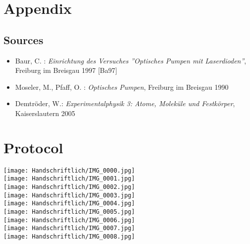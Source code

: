 \section{Appendix}

\begin{appendix}
\section{Sources}

\begin{itemize}
\item Baur, C. : \emph{Einrichtung des Versuches ''Optisches Pumpen mit Laserdioden''}, Freiburg im Breisgau 1997 [Ba97]
\item Moseler, M., Pfaff, O. : \emph{Optisches Pumpen}, Freiburg im Breisgau 1990
\item Demtröder, W.: \emph{Experimentalphysik 3: Atome, Moleküle und Festkörper}, Kaiserslautern 2005
\end{itemize}

\end{appendix}

\clearpage

\section{Protocol}
\centering \texttt{[image: Handschriftlich/IMG\_0000.jpg]}\\
\centering \texttt{[image: Handschriftlich/IMG\_0001.jpg]}\\
\centering \texttt{[image: Handschriftlich/IMG\_0002.jpg]}\\
\centering \texttt{[image: Handschriftlich/IMG\_0003.jpg]}\\
\centering \texttt{[image: Handschriftlich/IMG\_0004.jpg]}\\
\centering \texttt{[image: Handschriftlich/IMG\_0005.jpg]}\\
\centering \texttt{[image: Handschriftlich/IMG\_0006.jpg]}\\
\centering \texttt{[image: Handschriftlich/IMG\_0007.jpg]}\\
\centering \texttt{[image: Handschriftlich/IMG\_0008.jpg]}